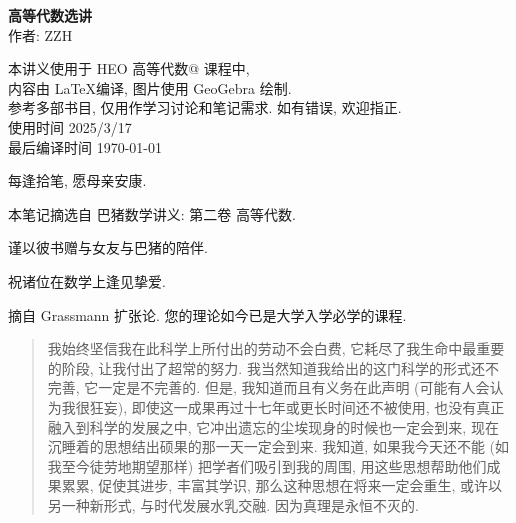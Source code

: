 \documentclass[UTF8]{book}
\makeatletter
\newcommand{\Rmnum}[1]{\expandafter\@slowromancap\romannumeral #1@}
\makeatother
\begin{document}



\begin{titlepage}
    \vspace*{10em}
\begin{center}
    \textbf{\songti 高等代数选讲} \\ %
    \vspace{4em} %
    作者: ZZH \\ %
    \vspace{10em} %

    本讲义使用于 HEO 高等代数\Rmnum{2} 课程中, \\
    内容由 \LaTeX 编译, 图片使用 GeoGebra 绘制. \\
    参考多部书目, 仅用作学习讨论和笔记需求. 如有错误, 欢迎指正. \\
    使用时间 2025/3/17\\

    最后编译时间 \today\\
\end{center}

\end{titlepage} 

\newpage

\vspace*{5em}

每逢拾笔, 愿母亲安康. 

本笔记摘选自 巴猪数学讲义: 第二卷 高等代数. 

谨以彼书赠与女友与巴猪的陪伴. 

祝诸位在数学上逢见挚爱. 

\vspace*{5em}

摘自 Grassmann 扩张论. 您的理论如今已是大学入学必学的课程. 

\begin{quotation}
    \kaishu
    我始终坚信我在此科学上所付出的劳动不会白费, 它耗尽了我生命中最重要的阶段, 
    让我付出了超常的努力. 我当然知道我给出的这门科学的形式还不完善, 
    它一定是不完善的. 但是, 我知道而且有义务在此声明 (可能有人会认为我很狂妄), 
    即使这一成果再过十七年或更长时间还不被使用, 也没有真正融入到科学的发展之中, 
    它冲出遗忘的尘埃现身的时候也一定会到来, 现在沉睡着的思想结出硕果的那一天一定会到来. 
    我知道, 如果我今天还不能 (如我至今徒劳地期望那样) 把学者们吸引到我的周围, 
    用这些思想帮助他们成果累累, 促使其进步, 丰富其学识, 
    那么这种思想在将来一定会重生, 或许以另一种新形式, 与时代发展水乳交融. 
    因为真理是永恒不灭的. 
    \songti
\end{quotation}
\end{document}
